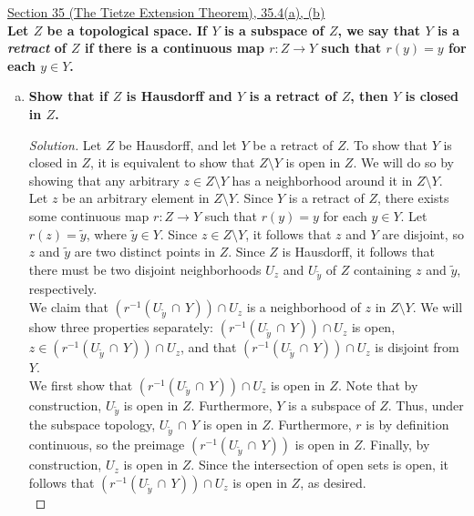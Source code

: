 \documentclass[11pt]{article}
\newenvironment{solution}
  {\renewcommand\qedsymbol{$\blacksquare$}\begin{proof}[Solution]}
  {\end{proof}}
\begin{document}
\underline{Section 35 (The Tietze Extension Theorem), 35.4(a), (b)} \\

\textbf{Let $Z$ be a topological space. If $Y$ is a subspace of $Z$, we say that $Y$ is a \textit{retract} of $Z$ if there is a continuous map $r\colon Z \rightarrow Y$ such that $r(y) = y$ for each $y \in Y$.}
\begin{enumerate}[a)]
    \item \textbf{Show that if $Z$ is Hausdorff and $Y$ is a retract of $Z$, then $Y$ is closed in $Z$.}
    \begin{solution}
    Let $Z$ be Hausdorff, and let $Y$ be a retract of $Z$. To show that $Y$ is closed in $Z$, it is equivalent to show that $Z \setminus Y$ is open in $Z$. We will do so by showing that any arbitrary $z \in Z \setminus Y$ has a neighborhood around it in $Z \setminus Y$. \\

    Let $z$ be an arbitrary element in $Z \setminus Y$. Since $Y$ is a retract of $Z$, there exists some continuous map $r\colon Z \rightarrow Y$ such that $r(y) = y$ for each $y \in Y$. Let $r(z) = \tilde{y}$, where $\tilde{y} \in Y$. 
    Since $z \in Z \setminus Y$, it follows that $z$ and $Y$ are disjoint, so $z$ and $\tilde{y}$ are two distinct points in $Z$. Since $Z$ is Hausdorff, 
    it follows that there must be two disjoint neighborhoods $U_z$ and $U_{\tilde{y}}$ of $Z$ containing $z$ and $\tilde{y}$, respectively. \\

    We claim that $(r^{-1}(U_{\tilde{y}} \, \cap \, Y)) \cap U_z$ is a neighborhood of $z$ in $Z \setminus Y$. We will show three properties separately: $(r^{-1}(U_{\tilde{y}} \, \cap \, Y)) \cap U_z$ is open, $z \in (r^{-1}(U_{\tilde{y}} \, \cap \, Y)) \cap U_z$, and that  $(r^{-1}(U_{\tilde{y}} \, \cap \, Y)) \cap U_z$ is disjoint from $Y$. \\

    We first show that $(r^{-1}(U_{\tilde{y}} \,\cap \, Y)) \cap U_z$ is open in $Z$. Note that by construction, $U_{\tilde{y}}$ is open in $Z$. Furthermore, $Y$ is a subspace of $Z$. Thus, under the subspace topology, $U_{\tilde{y}} \, \cap \, Y$ is open in $Z$. Furthermore,
    $r$ is by definition continuous, so the preimage $(r^{-1}(U_{\tilde{y}} \, \cap \, Y))$ is open in $Z$. Finally, by construction, $U_z$ is open in $Z$. Since the intersection of open sets is open, it follows that
    $(r^{-1}(U_{\tilde{y}} \, \cap \, Y)) \cap U_z$ is open in $Z$, as desired. \\


\end{solution}
\end{enumerate}
\end{document}
